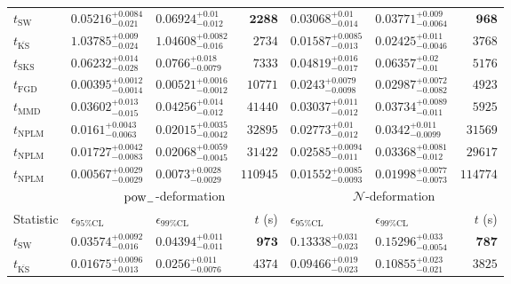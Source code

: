 \begin{tabular}{l|llr|llr}
	\midrule
	$t_{\mathrm{SW}}$ & $0.05216_{-0.021}^{+0.0084}$ & $0.06924_{-0.012}^{+0.01}$ & ${\mathbf{2288}}$ & $0.03068_{-0.014}^{+0.01}$ & $0.03771_{-0.0064}^{+0.009}$ & ${\mathbf{968}}$ \\
	$t_{\overline{\mathrm{KS}}}$ & $1.03785_{-0.024}^{+0.009}$ & $1.04608_{-0.016}^{+0.0082}$ & $2734$ & ${\mathbf{0.01587_{-0.013}^{+0.0085}}}$ & ${\mathbf{0.02425_{-0.0046}^{+0.011}}}$ & $3768$ \\
	$t_{\mathrm{SKS}}$ & $0.06232_{-0.028}^{+0.014}$ & $0.0766_{-0.0079}^{+0.018}$ & $7333$ & $0.04819_{-0.017}^{+0.016}$ & $0.06357_{-0.01}^{+0.02}$ & $5176$ \\
	$t_{\mathrm{FGD}}$ & ${\mathbf{0.00395_{-0.0014}^{+0.0012}}}$ & ${\mathbf{0.00521_{-0.0012}^{+0.0016}}}$ & $10771$ & $0.0243_{-0.0098}^{+0.0079}$ & $0.02987_{-0.0082}^{+0.0072}$ & $4923$ \\
	$t_{\mathrm{MMD}}$ & $0.03602_{-0.015}^{+0.013}$ & $0.04256_{-0.012}^{+0.014}$ & $41440$ & $0.03037_{-0.012}^{+0.011}$ & $0.03734_{-0.011}^{+0.0089}$ & $5925$ \\
\rowcolor{red!35}	$t_{\mathrm{NPLM}}$ & $0.0161_{-0.0063}^{+0.0043}$ & $0.02015_{-0.0042}^{+0.0035}$ & $32895$ & $0.02773_{-0.012}^{+0.01}$ & $0.0342_{-0.0099}^{+0.011}$ & $31569$ \\
\rowcolor{blue!35}	$t_{\mathrm{NPLM}}$ & $0.01727_{-0.0083}^{+0.0042}$ & $0.02068_{-0.0045}^{+0.0059}$ & $31422$ & $0.02585_{-0.011}^{+0.0094}$ & $0.03368_{-0.012}^{+0.0081}$ & $29617$ \\
\rowcolor{green!35}	$t_{\mathrm{NPLM}}$ & $0.00567_{-0.0029}^{+0.0029}$ & $0.0073_{-0.0029}^{+0.0028}$ & $110945$ & $0.01552_{-0.0093}^{+0.0085}$ & $0.01998_{-0.0073}^{+0.0077}$ & $114774$ \\
	\toprule
	\multicolumn{1}{c}{} & \multicolumn{3}{c}{$\rm{pow}_{-}$-deformation} & \multicolumn{3}{c}{$\mathcal{N}$-deformation} \\
Statistic & $\epsilon_{95\%\mathrm{CL}}$ & $\epsilon_{99\%\mathrm{CL}}$ & $t$ (s) & $\epsilon_{95\%\mathrm{CL}}$ & $\epsilon_{99\%\mathrm{CL}}$ & $t$ (s) \\
	\midrule
	$t_{\mathrm{SW}}$ & $0.03574_{-0.016}^{+0.0092}$ & $0.04394_{-0.011}^{+0.011}$ & ${\mathbf{973}}$ & $0.13338_{-0.023}^{+0.031}$ & $0.15296_{-0.0054}^{+0.033}$ & ${\mathbf{787}}$ \\
	$t_{\overline{\mathrm{KS}}}$ & ${\mathbf{0.01675_{-0.013}^{+0.0096}}}$ & ${\mathbf{0.0256_{-0.0076}^{+0.011}}}$ & $4374$ & $0.09466_{-0.023}^{+0.019}$ & $0.10855_{-0.021}^{+0.023}$ & $3825$ \\

\end{tabular}
